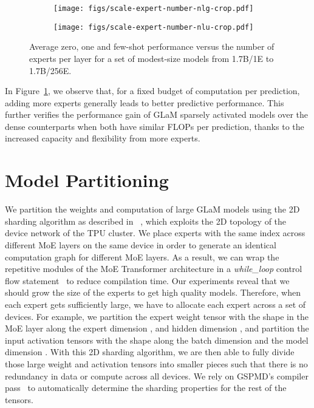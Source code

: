 \documentclass{article}
\newcommand{\glam}{GLaM\xspace}
\begin{document}
\begin{figure}[htb]
\centering
\begin{subfigure}[b]{0.49\columnwidth}
     \texttt{[image: figs/scale-expert-number-nlg-crop.pdf]}
\end{subfigure}
\begin{subfigure}[b]{0.49\columnwidth}
     \texttt{[image: figs/scale-expert-number-nlu-crop.pdf]}
\end{subfigure}
\caption{Average zero, one and few-shot performance versus the number of experts per layer for a set of modest-size models from 1.7B/1E to 1.7B/256E.}
\label{fig:scale-number} 
\end{figure}

In Figure~\ref{fig:scale-number}, we observe that, for a fixed budget of computation per prediction, adding more experts generally leads to better predictive performance. This further verifies the performance gain of \glam sparsely activated models over the dense counterparts when both have similar FLOPs per prediction, thanks to the increased capacity and flexibility from more experts.




\section{Model Partitioning}
\label{sec:gshard}
We partition the weights and computation of large \glam models using the 2D sharding algorithm as described in ~\citet{xu2021gspmd}, which exploits the 2D topology of the device network of the TPU cluster. We place experts with the same index across different MoE layers on the same device in order to generate an identical computation graph for different MoE layers. As a result, we can wrap the repetitive modules of the MoE Transformer architecture in a \textit{while\_loop} control flow statement~\cite{abadi2016tensorflow,yu2018dynamic} to reduce compilation time.  Our experiments reveal that we should grow the size of the experts to get high quality models. Therefore, when each expert gets sufficiently large, we have to allocate each expert across a set of  devices. For example, we partition the expert weight tensor with the shape  in the MoE layer along the expert dimension , and hidden dimension , and partition the input activation tensors with the shape  along the batch dimension  and the model dimension .  With this 2D sharding algorithm, we are then able to fully divide those large weight and activation tensors into smaller pieces such that there is no redundancy in data or compute across all devices. We rely on GSPMD's compiler pass~\cite{xu2021gspmd} to automatically determine the sharding properties for the rest of the tensors.
\end{document}
